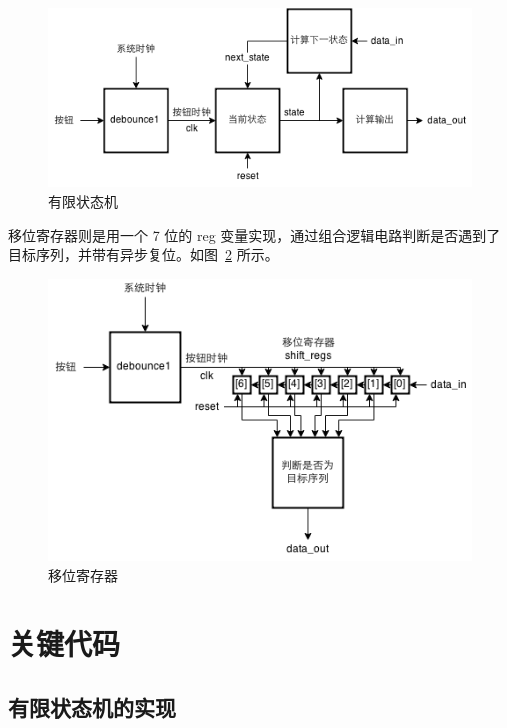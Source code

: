 \documentclass[11pt,a4paper]{article}
\begin{document}
\begin{figure}[htb]
  \centering
    \includegraphics{exp2_fsm_96}
  \caption{有限状态机}
  \label{fig:有限状态机}
\end{figure}


移位寄存器则是用一个 7 位的 reg 变量实现，通过组合逻辑电路判断是否遇到了目标序列，并带有异步复位。如图~\ref{fig:移位寄存器} 所示。

\begin{figure}[htb]
  \centering
    \includegraphics{exp2_shift_regs_96}
  \caption{移位寄存器}
  \label{fig:移位寄存器}
\end{figure}


\section{关键代码}

\subsection{有限状态机的实现}
\end{document}
